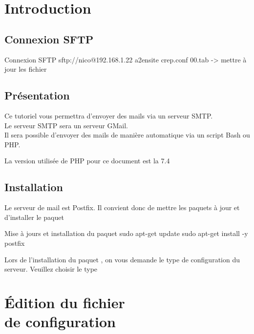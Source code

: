 
\chapter{Introduction}


\section{Connexion SFTP}

\begin{Bash}{Connexion SFTP}
sftp://nico@192.168.1.22
a2ensite crep.conf 00.tab -> mettre à jour les fichier
\end{Bash}

\section{Présentation}
Ce tutoriel vous permettra d'envoyer des mails via un serveur SMTP. \\
Le serveur SMTP sera un serveur GMail. \\

Il sera possible d'envoyer des mails de manière automatique via un script Bash ou PHP.

La version utilisée de PHP pour ce document est la 7.4

\section{Installation}

Le serveur de mail est Postfix. Il convient donc de mettre les paquets à jour et d'installer le paquet  

\begin{Bash}{Mise à jours et installation du paquet}
sudo apt-get update
sudo apt-get install -y postfix
\end{Bash}

Lors de l'installation du paquet , on vous demande le type de configuration du serveur. Veuillez choisir le type  




\chapter{Édition du fichier \\de configuration}



